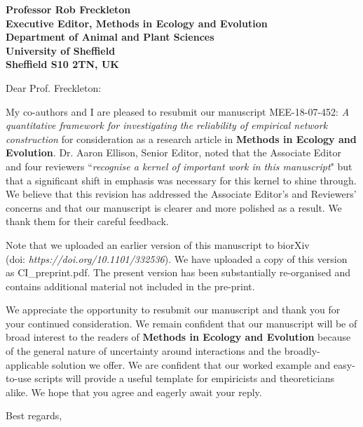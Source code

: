 \documentclass[12pt]{letter}
\begin{document}
\begin{letter}{\bf Professor Rob Freckleton\\
               Executive Editor, Methods in Ecology and Evolution\\
               Department of Animal and Plant Sciences\\
               University of Sheffield\\
               Sheffield S10 2TN, UK
                               }


\opening{Dear Prof. Freckleton:}

    My co-authors and I are pleased to resubmit our manuscript 
    MEE-18-07-452:  \emph{A quantitative framework for investigating the reliability of empirical network construction} for consideration as a research article in \textbf{Methods in Ecology and Evolution}. Dr. Aaron Ellison, Senior Editor, noted that the Associate Editor and four reviewers ``\emph{recognise a kernel of important work in this manuscript}" but that a significant shift in emphasis was necessary for this kernel to shine through. We believe that this revision has addressed the Associate Editor's and Reviewers' concerns and that our manuscript is clearer and more polished as a result. We thank them for their careful feedback.


    Note that we uploaded an earlier version of this manuscript to biorXiv \\(doi: \emph{https://doi.org/10.1101/332536}). We have uploaded a copy of this version as CI\_preprint.pdf. The present version has been substantially re-organised and contains additional material not included in the pre-print.


    We appreciate the opportunity to resubmit our manuscript and thank you for your continued consideration. We remain confident that our manuscript will be of broad interest to the readers of \textbf{Methods in Ecology and Evolution} because of the general nature of uncertainty around interactions and the broadly-applicable solution we offer. We are confident that our worked example and easy-to-use scripts will provide a useful template for empiricists and theoreticians alike. We hope that you agree and eagerly await your reply.


\closing{Best regards,}


\end{letter}
\end{document}
